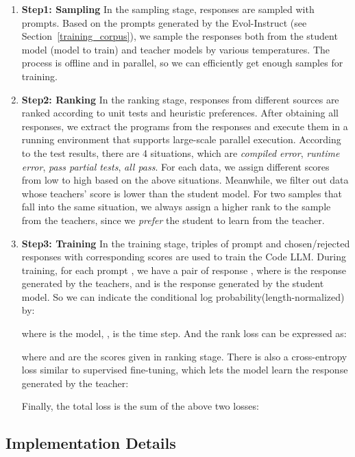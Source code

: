 \documentclass{article}
\begin{document}
\begin{enumerate}
    \item \textbf{Step1: Sampling} In the sampling stage, responses are sampled with prompts. Based on the prompts generated by the Evol-Instruct (see Section~\ref{training_corpus}), we sample the responses both from the student model (model to train) and teacher models by various temperatures. The process is offline and in parallel, so we can efficiently get enough samples for training.
    \item \textbf{Step2: Ranking} In the ranking stage, responses from different sources are ranked according to unit tests and heuristic preferences. After obtaining all responses, we extract the programs from the responses and execute them in a running environment that supports large-scale parallel execution. According to the test results, there are 4 situations, which are \textit{compiled error}, \textit{runtime error}, \textit{pass partial tests}, \textit{all pass}. For each data, we assign different scores from low to high based on the above situations. Meanwhile, we filter out data whose teachers' score is lower than the student model. For two samples that fall into the same situation, we always assign a higher rank to the sample from the teachers, since we \textit{prefer} the student to learn from the teacher.
    \item \textbf{Step3: Training} In the training stage, triples of prompt and chosen/rejected responses with corresponding scores are used to train the Code LLM. During training, for each prompt , we have a pair of response , where  is the response generated by the teachers, and  is the response generated by the student model. So we can indicate the conditional log probability(length-normalized)  by:
    
    where  is the model, ,  is the time step. And the rank loss can be expressed as:
    
    where  and  are the scores given in ranking stage. There is also a cross-entropy loss similar to supervised fine-tuning, which lets the model learn the response generated by the teacher:
    
    Finally, the total loss is the sum of the above two losses:
    
\end{enumerate}

\subsection{Implementation Details}
\end{document}
